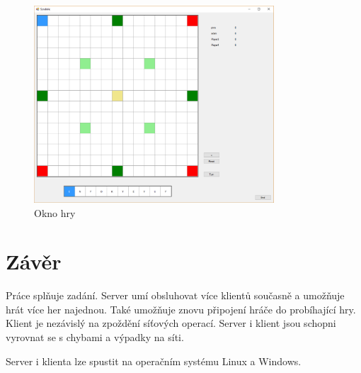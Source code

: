 \begin{figure}[H]
	\centering
	\includegraphics[width=0.8\textwidth]{img/game.eps}
	\caption{Okno hry}
  \label{game}
\end{figure}



\chapter{Závěr}
Práce splňuje zadání. Server umí obsluhovat více klientů současně a umožňuje hrát více her najednou. Také umožňuje znovu připojení hráče do probíhající hry. Klient je nezávislý na zpoždění síťových operací. Server i klient jsou schopni vyrovnat se s chybami a výpadky na síti.

Server i klienta lze spustit na operačním systému Linux a Windows.